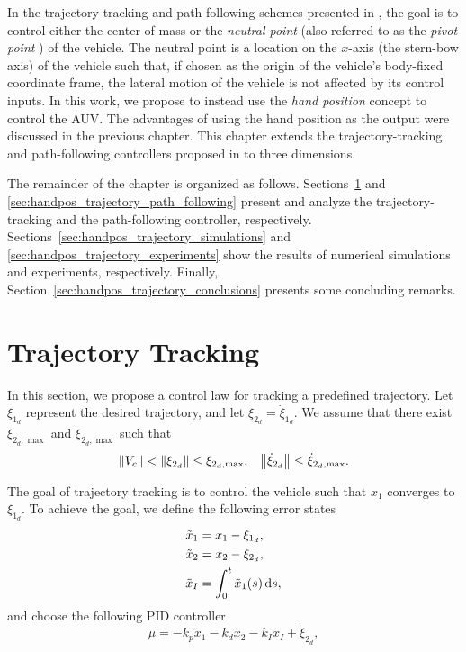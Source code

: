 In the trajectory tracking and path following schemes presented in \citeexistingmethods, the goal is to control either the center of mass or the \emph{neutral point} (also referred to as the \emph{pivot point} \cite{paliotta_trajectory_2019}) of the vehicle.
The neutral point is a location on the $x$-axis (the stern-bow axis) of the vehicle such that, if chosen as the origin of the vehicle's body-fixed coordinate frame, the lateral motion of the vehicle is not affected by its control inputs.
In this work, we propose to instead use the \emph{hand position} concept to control the AUV.
The advantages of using the hand position as the output were discussed in the previous chapter.
This chapter extends the trajectory-tracking and path-following controllers proposed in \cite{paliotta_trajectory_2019} to three dimensions.

The remainder of the chapter is organized as follows.
Sections~\ref{sec:handpos_trajectory_trajectory_tracking} and \ref{sec:handpos_trajectory_path_following} present and analyze the trajectory-tracking and the path-following controller, respectively.
Sections~\ref{sec:handpos_trajectory_simulations} and \ref{sec:handpos_trajectory_experiments} show the results of numerical simulations and experiments, respectively.
Finally, Section~\ref{sec:handpos_trajectory_conclusions} presents some concluding remarks.

\section{Trajectory Tracking}
\label{sec:handpos_trajectory_trajectory_tracking}
In this section, we propose a control law for tracking a predefined trajectory.
Let $\xi_{1_d}$ represent the desired trajectory, and let $\xi_{2_d} = \dot{\xi}_{1_d}$.
We assume that there exist $\xi_{2_d, \max}$ and $\dot{\xi}_{2_d, \max}$ such that
\begin{align}
    \left\|V_c\right\| &< \left\|\xi_{2_d}\right\| \leq \xi_{2_d, \max}, &
    \left\|\dot{\xi}_{2_d}\right\| \leq \dot{\xi}_{2_d, \max}.
\end{align}

The goal of trajectory tracking is to control the vehicle such that $x_1$ converges to $\xi_{1_d}$.
To achieve the goal, we define the following error states
\begin{subequations}
    \begin{align}
        \tilde{x}_1 &= x_1 - \xi_{1_d}, \\
        \tilde{x}_2 &= x_2 - \xi_{2_d}, \\
        \tilde{x}_I &= \int_{0}^t \tilde{x}_1(s)\, {\rm d}s,
    \end{align} \label{eq:handpos_trajectory_error_states}
\end{subequations}
and choose the following PID controller
\begin{equation}
    \mu = -k_p \tilde{x}_1 - k_d \tilde{x}_2 - k_I \tilde{x}_I + \dot{\xi}_{2_d}, \label{eq:handpos_trajectory_external_controller}
\end{equation}

